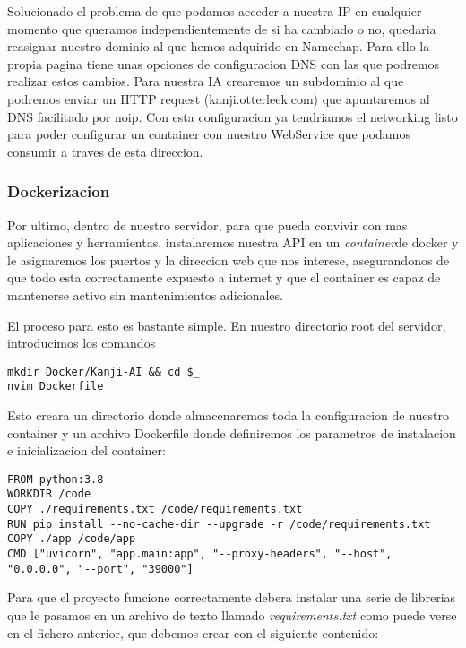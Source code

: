 \documentclass{article}
\begin{document}
Solucionado el problema de que podamos acceder a nuestra IP en cualquier momento que queramos independientemente de si ha cambiado o no, quedaria reasignar nuestro dominio al que hemos adquirido en Namechap. Para ello la propia pagina tiene unas opciones de configuracion DNS con las que podremos realizar estos cambios. Para nuestra IA crearemos un subdominio al que podremos enviar un HTTP request (kanji.otterleek.com) que apuntaremos al DNS facilitado por noip. Con esta configuracion ya tendriamos el networking listo para poder configurar un container con nuestro WebService que podamos consumir a traves de esta direccion.

\subsubsection{Dockerizacion}
Por ultimo, dentro de nuestro servidor, para que pueda convivir con mas aplicaciones y herramientas, instalaremos nuestra API en un \textit{container}\footnotemark[1] de docker y le asignaremos los puertos y la direccion web que nos interese, asegurandonos de que todo esta correctamente expuesto a internet y que el container es capaz de mantenerse activo sin mantenimientos adicionales.

\noindent El proceso para esto es bastante simple. En nuestro directorio root del servidor, introducimos los comandos

\noindent\begin{minipage}{\textwidth}
\begin{lstlisting}[numbers=none]
mkdir Docker/Kanji-AI && cd $_
nvim Dockerfile
\end{lstlisting}
\end{minipage}
Esto creara un directorio donde almacenaremos toda la configuracion de nuestro container y un archivo Dockerfile donde definiremos los parametros de instalacion e inicializacion del container:

\noindent\begin{minipage}{\textwidth}
\begin{lstlisting}[numbers=none]
FROM python:3.8
WORKDIR /code
COPY ./requirements.txt /code/requirements.txt
RUN pip install --no-cache-dir --upgrade -r /code/requirements.txt
COPY ./app /code/app
CMD ["uvicorn", "app.main:app", "--proxy-headers", "--host", "0.0.0.0", "--port", "39000"]
\end{lstlisting}
\end{minipage}
Para que el proyecto funcione correctamente debera instalar una serie de librerias que le pasamos en un archivo de texto llamado \textit{requirements.txt} como puede verse en el fichero anterior, que debemos crear con el siguiente contenido:
\end{document}
